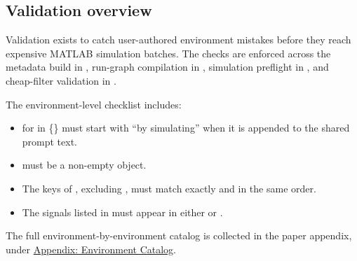 \documentclass[11pt]{article}
\begin{document}
\subsection*{Validation overview}

Validation exists to catch user-authored environment mistakes before they reach expensive MATLAB simulation batches.
The checks are enforced across the metadata build in , run-graph compilation in , simulation preflight in , and cheap-filter validation in .

The environment-level checklist includes:

\begin{itemize}
\item {} for \termDescLevel in \{\} must start with ``by simulating'' when it is appended to the shared prompt text.
\item {} must be a non-empty object.
\item The keys of , excluding , must match  exactly and in the same order.
\item The signals listed in  must appear in either  or .
\end{itemize}

The full environment-by-environment catalog is collected in the paper appendix, under \hyperref[docstart:appendix_environment]{Appendix: Environment Catalog}.
\end{document}
